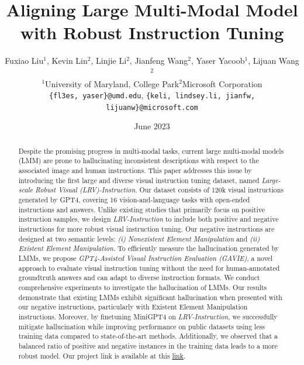 \documentclass[letterpaper,10pt]{article}
\title{Aligning Large Multi-Modal Model with Robust Instruction Tuning}
\author{%
 Fuxiao Liu$^1$, Kevin Lin$^2$, Linjie Li$^2$, Jianfeng Wang$^2$, Yaser Yacoob$^1$, Lijuan Wang$^2$\\ 
$^1$University of Maryland, College Park\quad $^2$Microsoft Corporation\\
\texttt{\small\{fl3es, yaser\}@umd.edu}, 
\texttt{\small\{keli, lindsey.li, jianfw, lijuanw\}@microsoft.com}
}
\date{June 2023}
\begin{document}
\maketitle

\begin{abstract}
Despite the promising progress in multi-modal tasks, current large multi-modal models (LMM) are prone to hallucinating inconsistent descriptions with respect to the associated image and human instructions. 
This paper addresses this issue by introducing the first large and diverse visual instruction tuning dataset, named \textit{Large-scale Robust Visual (LRV)-Instruction}.
Our dataset consists of 120k visual instructions generated by GPT4, covering 16 vision-and-language tasks with open-ended instructions and answers. 
Unlike existing studies that primarily focus on positive instruction samples, we design \textit{LRV-Instruction} to include both positive and negative instructions for more robust visual instruction tuning.
Our negative instructions are designed at two semantic levels: \textit{(i) Nonexistent Element Manipulation} and \textit{(ii) Existent Element Manipulation}. To efficiently measure the hallucination generated by LMMs, we propose \textit{GPT4-Assisted Visual Instruction Evaluation (GAVIE)}, a novel approach to evaluate visual instruction tuning without the need for human-annotated groundtruth answers and can adapt to diverse instruction formats. We conduct comprehensive experiments to investigate the hallucination of LMMs. 
Our results demonstrate that existing LMMs exhibit significant hallucination when presented with our negative instructions, particularly with Existent Element Manipulation instructions.
Moreover, by finetuning MiniGPT4 on \textit{LRV-Instruction}, 
we successfully mitigate hallucination while improving performance on public datasets using less training data compared to state-of-the-art methods.
Additionally, we observed that a balanced ratio of positive and negative instances in the training data leads to a more robust model. Our project link is available at this \href{https://fuxiaoliu.github.io/LRV/}{link}. 

\end{abstract}
\end{document}
